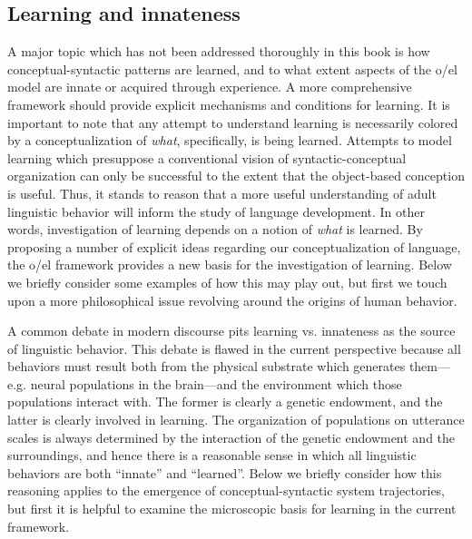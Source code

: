 \subsection{Learning and innateness}

A major topic which has not been addressed thoroughly in this book is how conceptual-syntactic patterns are learned, and to what extent aspects of the o/el model are innate or acquired through experience. A more comprehensive framework should provide explicit mechanisms and conditions for learning. It is important to note that any attempt to understand learning is necessarily colored by a conceptualization of \textit{what}, specifically, is being learned. Attempts to model learning which presuppose a conventional vision of syntactic-conceptual organization can only be successful to the extent that the object-based conception is useful. Thus, it stands to reason that a more useful understanding of adult linguistic behavior will inform the study of language development. In other words, investigation of learning depends on a notion of \textit{what} is learned. By proposing a number of explicit ideas regarding our conceptualization of language, the o/el framework provides a new basis for the investigation of learning. Below we briefly consider some examples of how this may play out, but first we touch upon a more philosophical issue revolving around the origins of human behavior.

A common debate in modern discourse pits learning vs. innateness as the source of linguistic behavior. This debate is flawed in the current perspective because all behaviors must result both from the physical substrate which generates them—e.g. neural populations in the brain—and the environment which those populations interact with. The former is clearly a genetic endowment, and the latter is clearly involved in learning. The organization of populations on utterance scales is always determined by the interaction of the genetic endowment and the surroundings, and hence there is a reasonable sense in which all linguistic behaviors are both “innate” and “learned”.  Below we briefly consider how this reasoning applies to the emergence of conceptual-syntactic system trajectories, but first it is helpful to examine the microscopic basis for learning in the current framework.

